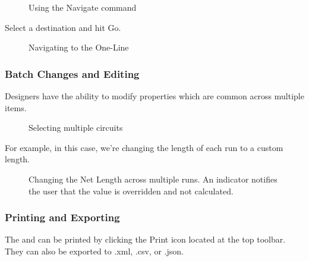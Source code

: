 \documentclass[letterpaper,10pt,english]{sphinxmanual}
\begin{document}
\begin{figure}[H]
\centering
\capstart

\noindent{}
\caption{Using the Navigate command}\label{\detokenize{docs/userguide/buildingelectricalmodel/studies/index-studies:id4}}\end{figure}

Select a destination and hit Go.

\begin{figure}[H]
\centering
\capstart

\noindent{}
\caption{Navigating to the One-Line}\label{\detokenize{docs/userguide/buildingelectricalmodel/studies/index-studies:id5}}\end{figure}


\subsubsection{Batch Changes and Editing}
\label{\detokenize{docs/userguide/buildingelectricalmodel/studies/index-studies:batch-changes-and-editing}}
Designers have the ability to modify properties which are common across multiple items.

\begin{figure}[H]
\centering
\capstart

\noindent{}
\caption{Selecting multiple circuits}\label{\detokenize{docs/userguide/buildingelectricalmodel/studies/index-studies:id6}}\end{figure}

For example, in this case, we’re changing the length of each run to a custom length.

\begin{figure}[H]
\centering
\capstart

\noindent{}
\caption{Changing the Net Length across multiple runs.  An indicator notifies the user that the value is overridden and not calculated.}\label{\detokenize{docs/userguide/buildingelectricalmodel/studies/index-studies:id7}}\end{figure}


\subsubsection{Printing and Exporting}
\label{\detokenize{docs/userguide/buildingelectricalmodel/studies/index-studies:printing-and-exporting}}
The {\hyperref[\detokenize{docs/userguide/buildingelectricalmodel/studies/index-studies:studies}]{}} and {\hyperref[\detokenize{docs/userguide/pricingmodel/pricingreport/index-pricing_report:pricing-report}]{}} can be printed by clicking the Print icon located at the top toolbar.  They can also be exported to .xml, .csv, or .json.
\end{document}
